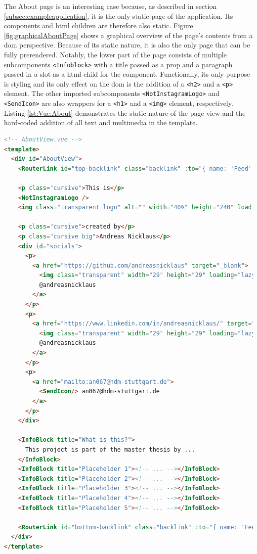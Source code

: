 \documentclass[a4paper, 12pt]{article}
\begin{document}
The About page is an interesting case because, as described in section \ref{subsec:exampleapplication}, it is the only static page of the application.
Its components and \acrshort{html} children are therefore also static.
Figure \ref{fig:graphicalAboutPage} shows a graphical overview of the page's contents from a \acrshort{dom} perspective.
Because of its static nature, it is also the only page that can be fully prerendered.
Notably, the lower part of the page consists of multiple subcomponents \verb|<Infoblock>| with a title passed as a prop and a paragraph passed in a slot as a \acrshort{html} child for the component.
Functionally, its only purpose is styling and its only effect on the \acrshort{dom} is the addition of a \verb|<h2>| and a \verb|<p>| element.
The other imported subcomponents \verb|<NotInstagramLogo>| and \verb|<SendIcon>| are also wrappers for a \verb|<h1>| and a \verb|<img>| element, respectively.
Listing \ref{lst:Vue:About} demonstrates the static nature of the page view and the hard-coded addition of all text and multimedia in the template.

\vspace{1cm}
\begin{lstlisting}[caption=About page in Vue.js (as displayed in figure \ref{fig:graphicalAboutPage}), label={lst:Vue:About}, language=HTML]
<!-- AboutView.vue -->
<template>
  <div id="AboutView">
    <RouterLink id="top-backlink" class="backlink" :to="{ name: 'Feed' }"> back </RouterLink>

    <p class="cursive">This is</p>
    <NotInstagramLogo />
    <img class="transparent logo" alt="" width="40%" height="240" loading="lazy" :src="Logo" />

    <p class="cursive">created by</p>
    <p class="cursive big">Andreas Nicklaus</p>
    <div id="socials">
      <p>
        <a href="https://github.com/andreasnicklaus" target="_blank">
          <img class="transparent" width="29" height="29" loading="lazy" :src="GitHub" />
          @andreasnicklaus
        </a>
      </p>
      <p>
        <a href="https://www.linkedin.com/in/andreasnicklaus/" target="_blank">
          <img class="transparent" width="29" height="29" loading="lazy" :src="LinkedIn" />
          @andreasnicklaus
        </a>
      </p>
      <p>
        <a href="mailto:an067@hdm-stuttgart.de">
          <SendIcon/> an067@hdm-stuttgart.de
        </a>
      </p>
    </div>

    <InfoBlock title="What is this?">
      This project is part of the master thesis by ...
    </InfoBlock>
    <InfoBlock title="Placeholder 1"><!-- ... --></InfoBlock>
    <InfoBlock title="Placeholder 2"><!-- ... --></InfoBlock>
    <InfoBlock title="Placeholder 3"><!-- ... --></InfoBlock>
    <InfoBlock title="Placeholder 4"><!-- ... --></InfoBlock>
    <InfoBlock title="Placeholder 5"><!-- ... --></InfoBlock>

    <RouterLink id="bottom-backlink" class="backlink" :to="{ name: 'Feed' }"> back </RouterLink>
  </div>
</template>
\end{lstlisting}
\end{document}
